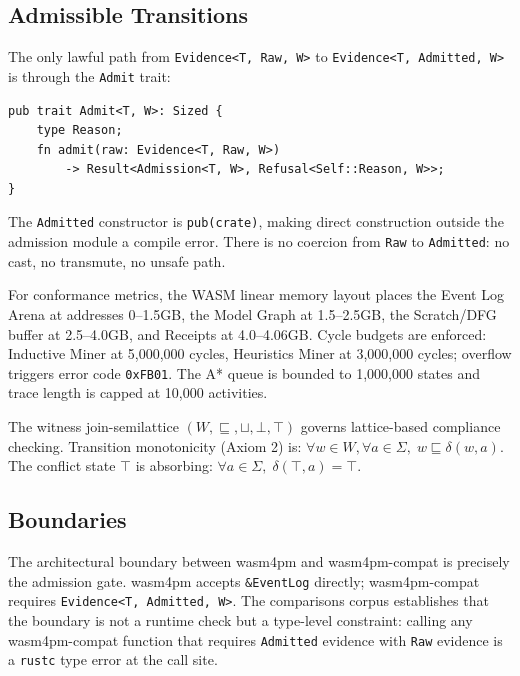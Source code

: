 \subsection{Admissible Transitions}
\label{sec:comparisons-arch-transitions}

The only lawful path from \texttt{Evidence<T, Raw, W>} to
\texttt{Evidence<T, Admitted, W>} is through the \texttt{Admit} trait:

\begin{verbatim}
pub trait Admit<T, W>: Sized {
    type Reason;
    fn admit(raw: Evidence<T, Raw, W>)
        -> Result<Admission<T, W>, Refusal<Self::Reason, W>>;
}
\end{verbatim}

The \texttt{Admitted} constructor is \texttt{pub(crate)}, making direct
construction outside the admission module a compile error. There is no coercion
from \texttt{Raw} to \texttt{Admitted}: no cast, no transmute, no unsafe path.

For conformance metrics, the WASM linear memory layout places the Event Log
Arena at addresses 0--1.5GB, the Model Graph at 1.5--2.5GB, the Scratch/DFG
buffer at 2.5--4.0GB, and Receipts at 4.0--4.06GB. Cycle budgets are enforced:
Inductive Miner at 5,000,000 cycles, Heuristics Miner at 3,000,000 cycles;
overflow triggers error code \texttt{0xFB01}. The A* queue is bounded to
1,000,000 states and trace length is capped at 10,000 activities.

The witness join-semilattice $(W, \sqsubseteq, \sqcup, \bot, \top)$ governs
lattice-based compliance checking. Transition monotonicity (Axiom 2) is:
$\forall w \in W, \forall a \in \Sigma, \; w \sqsubseteq \delta(w, a)$.
The conflict state $\top$ is absorbing: $\forall a \in \Sigma, \; \delta(\top, a) = \top$.

\subsection{Boundaries}
\label{sec:comparisons-arch-boundaries}

The architectural boundary between wasm4pm and wasm4pm-compat is precisely the
admission gate. wasm4pm accepts \texttt{\&EventLog} directly; wasm4pm-compat
requires \texttt{Evidence<T, Admitted, W>}. The comparisons corpus establishes
that the boundary is not a runtime check but a type-level constraint: calling
any wasm4pm-compat function that requires \texttt{Admitted} evidence with
\texttt{Raw} evidence is a \texttt{rustc} type error at the call site.

